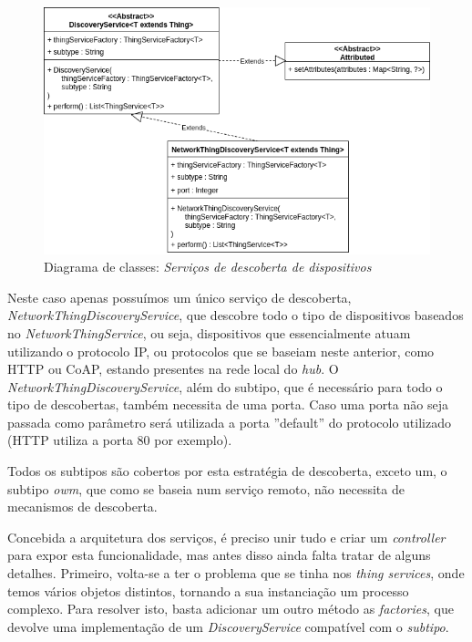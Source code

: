 \begin{figure}[H]
  \centering
        \includegraphics[scale=0.6]{img/hub-discovery.png}
  \caption{Diagrama de classes: \textit{Serviços de descoberta de dispositivos}}
\end{figure}

Neste caso apenas possuímos um único serviço de descoberta, \textit{NetworkThingDiscoveryService}, que descobre todo o tipo de dispositivos baseados no \textit{NetworkThingService}, ou seja, dispositivos que essencialmente atuam utilizando o protocolo IP, ou protocolos que se baseiam neste anterior, como HTTP ou CoAP, estando presentes na rede local do \textit{hub}. O \textit{NetworkThingDiscoveryService}, além do subtipo, que é necessário para todo o tipo de descobertas, também necessita de uma porta. Caso uma porta não seja passada como parâmetro será utilizada a porta ''default'' do protocolo utilizado (HTTP utiliza a porta 80 por exemplo).

Todos os subtipos são cobertos por esta estratégia de descoberta, exceto um, o subtipo \textit{owm}, que como se baseia num serviço remoto, não necessita de mecanismos de descoberta.

Concebida a arquitetura dos serviços, é preciso unir tudo e criar um \textit{controller} para expor esta funcionalidade, mas antes disso ainda falta tratar de alguns detalhes. Primeiro, volta-se a ter o problema que se tinha nos \textit{thing services}, onde temos vários objetos distintos, tornando a sua instanciação um processo complexo. Para resolver isto, basta adicionar um outro método as \textit{factories}, que devolve uma implementação de um \textit{DiscoveryService} compatível com o \textit{subtipo}.

